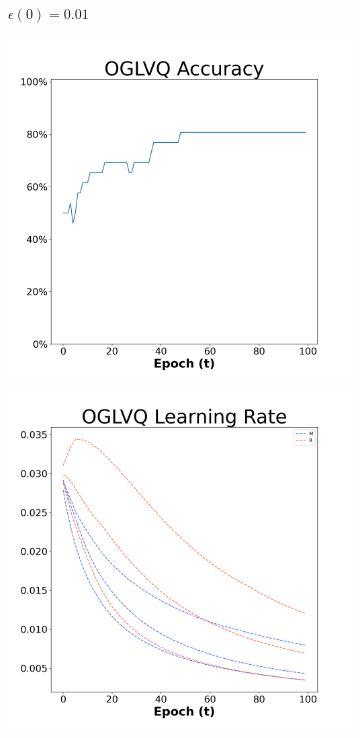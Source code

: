 \begin{figure}[H]
\begin{subfigure}{0.3\textwidth}
  \caption{$\epsilon(0)=0.01$}
\end{subfigure}\hfil %
\begin{subfigure}{0.3\textwidth}
  \includegraphics[width=\linewidth]{images/exper1/Sonar/OGLVQ_0.03_acc.png}
  \includegraphics[width=\linewidth]{images/exper1/Sonar/OGLVQ_0.03_lr.png}

\end{subfigure}
\end{figure}
